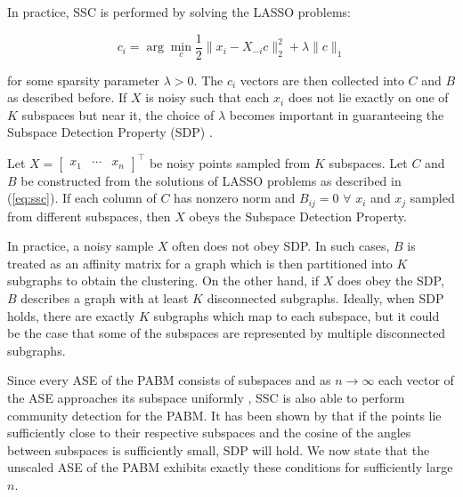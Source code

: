 \documentclass[
  11pt,
]{article}
\begin{document}
In practice, SSC is performed by solving the LASSO problems:

\begin{equation} \label{eq:ssc}
c_i = \arg\min_c \frac{1}{2} \|x_i - X_{-i} c \|_2^2 + \lambda \|c\|_1
\end{equation}

for some sparsity parameter \(\lambda > 0\). The \(c_i\) vectors are
then collected into \(C\) and \(B\) as described before. If \(X\) is
noisy such that each \(x_i\) does not lie exactly on one of \(K\)
subspaces but near it, the choice of \(\lambda\) becomes important in
guaranteeing the Subspace Detection Property (SDP)
\cite{jmlr-v28-wang13}.

\begin{definition} 
Let $X = \begin{bmatrix} x_1 & \cdots & x_n \end{bmatrix}^\top$ be noisy 
points sampled from $K$ subspaces. Let $C$ and $B$ be constructed from the 
solutions of LASSO problems as described in (\ref{eq:ssc}). If each column of 
$C$ has nonzero norm and $B_{ij} = 0$ $\forall$ $x_i$ and $x_j$ sampled from 
different subspaces, then $X$ obeys the Subspace Detection Property. 
\end{definition}

\begin{remark} 
In practice, a noisy sample $X$ often does not obey SDP. 
In such cases, $B$ is treated as an affinity matrix for a graph which 
is then partitioned into $K$ subgraphs to obtain the clustering. On the other 
hand, if $X$ does obey the SDP, $B$ describes a graph 
with at least $K$ disconnected subgraphs. Ideally, when SDP holds, 
there are exactly $K$ subgraphs which map to each subspace, 
but it could be the case that some of the subspaces are represented by 
multiple disconnected subgraphs.
\end{remark}

Since every ASE of the PABM consists of subspaces and as
\(n \to \infty\) each vector of the ASE approaches its subspace
uniformly \cite{rubindelanchy2017statistical}, SSC is also able to
perform community detection for the PABM. It has been shown by
\citet{jmlr-v28-wang13} that if the points lie sufficiently close to
their respective subspaces and the cosine of the angles between
subspaces is sufficiently small, SDP will hold. We now state that the
unscaled ASE of the PABM exhibits exactly these conditions for
sufficiently large \(n\).
\end{document}
